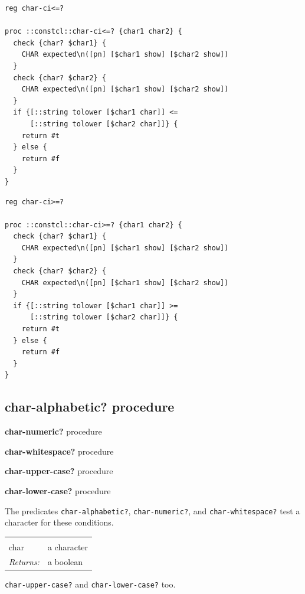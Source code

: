 \documentclass[twoside,9pt]{report}
\begin{document}
\begin{lstlisting}
reg char-ci<=?
 
proc ::constcl::char-ci<=? {char1 char2} {
  check {char? $char1} {
    CHAR expected\n([pn] [$char1 show] [$char2 show])
  }
  check {char? $char2} {
    CHAR expected\n([pn] [$char1 show] [$char2 show])
  }
  if {[::string tolower [$char1 char]] <=
      [::string tolower [$char2 char]]} {
    return #t
  } else {
    return #f
  }
}
\end{lstlisting}
\begin{lstlisting}
reg char-ci>=?
 
proc ::constcl::char-ci>=? {char1 char2} {
  check {char? $char1} {
    CHAR expected\n([pn] [$char1 show] [$char2 show])
  }
  check {char? $char2} {
    CHAR expected\n([pn] [$char1 show] [$char2 show])
  }
  if {[::string tolower [$char1 char]] >=
      [::string tolower [$char2 char]]} {
    return #t
  } else {
    return #f
  }
}
\end{lstlisting}
\subsection{char-alphabetic? procedure}
\label{char-alphabetic?-procedure}


\textbf{char-numeric?} procedure


\textbf{char-whitespace?} procedure


\textbf{char-upper-case?} procedure


\textbf{char-lower-case?} procedure


The predicates \texttt{char-alphabetic?}, \texttt{char-numeric?}, and \texttt{char-whitespace?} test a character for these conditions.

\noindent\begin{tabular}{ |p{1.5cm} p{8cm}| }
\hline
\rowcolor[HTML]{CCCCCC} \multicolumn{2}{|l|}{\bf char-alphabetic?, char-numeric?, char-whitespace? (public)} \\
char & a character \\
\textit{Returns:} & a boolean \\
\hline
\end{tabular}


\texttt{char-upper-case?} and \texttt{char-lower-case?} too.
\end{document}
